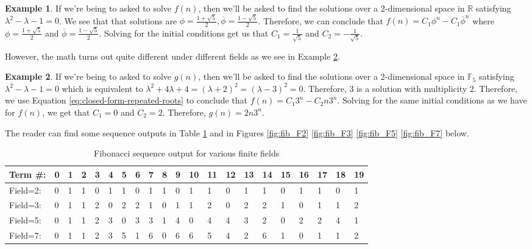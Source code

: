\documentclass[a4paper]{article}
\theoremstyle{definition}
\newtheorem{example}{Example}[section]
\begin{document}
\begin{example}
If we're being to asked to solve $f(n)$, then we'll be asked to find the solutions over a 2-dimensional space in $\mathbb{R}$ satisfying $\lambda^2-\lambda-1=0$. We see that that solutions are $\phi=\frac{1+\sqrt{5}}{2}, \overline{\phi}=\frac{1-\sqrt{5}}{2}$. Therefore, we can conclude that $f(n)= C_1\phi^n-C_1\overline{\phi}^n$ where $\phi=\frac{1+\sqrt{5}}{2}$ and $\overline{\phi}=\frac{1-\sqrt{5}}{2}$. Solving for the initial conditions get us that $C_1=\frac{1}{\sqrt{5}}$ and $C_2=-\frac{1}{\sqrt{5}}$.
\label{ex:fib-sol-R}
\end{example}

However, the math turns out quite different under different fields as we see in Example
\ref{ex:fib-sol-F_5}.
\\

\begin{example}
If we're being to asked to solve $g(n)$, then we'll be asked to find the solutions over a 2-dimensional space in $\mathbb{F}_5$ satisfying $\lambda^2-\lambda-1=0$ which is equivalent to $\lambda^2+4\lambda+4=(\lambda+2)^2=(\lambda-3)^2=0$. Therefore, $3$ is a solution with multiplicity 2. Therefore, we use Equation \ref{eq:closed-form-repeated-roots} to conclude that $f(n)= C_1 3^n-C_2n 3^n$. Solving for the same initial conditions as we have for $f(n)$, we get that $C_1=0$ and $C_2=2$. Therefore, $g(n)=2n3^n$.
\label{ex:fib-sol-F_5}
\end{example}

The reader can find some sequence outputs in Table \ref{tab:fib-out} and in Figures \ref{fig:fib_F2}
\ref{fig:fib_F3} \ref{fig:fib_F5} \ref{fig:fib_F7} below.

\begin{table}[!ht]
\begin{tabular}{|l|l|l|l|l|l|l|l|l|l|l|l|l|l|l|l|l|l|l|l|l|}
\hline
Term \#: & 0 & 1 & 2 & 3 & 4 & 5 & 6 & 7 & 8 & 9 & 10 & 11 & 12 & 13 & 14 & 15 & 16 & 17 & 18 & 19 \\ \hline
Field=2: & 0 & 1 & 1 & 0 & 1 & 1 & 0 & 1 & 1 & 0 & 1  & 1  & 0  & 1  & 1  & 0  & 1  & 1  & 0  & 1  \\ \hline
Field=3: & 0 & 1 & 1 & 2 & 0 & 2 & 2 & 1 & 0 & 1 & 1  & 2  & 0  & 2  & 2  & 1  & 0  & 1  & 1  & 2  \\ \hline
Field=5: & 0 & 1 & 1 & 2 & 3 & 0 & 3 & 3 & 1 & 4 & 0  & 4  & 4  & 3  & 2  & 0  & 2  & 2  & 4  & 1  \\ \hline
Field=7: & 0 & 1 & 1 & 2 & 3 & 5 & 1 & 6 & 0 & 6 & 6  & 5  & 4  & 2  & 6  & 1  & 0  & 1  & 1  & 2  \\ \hline
\end{tabular}
\caption{Fibonacci sequence output for various finite fields}
\label{tab:fib-out}
\end{table}
\end{document}
